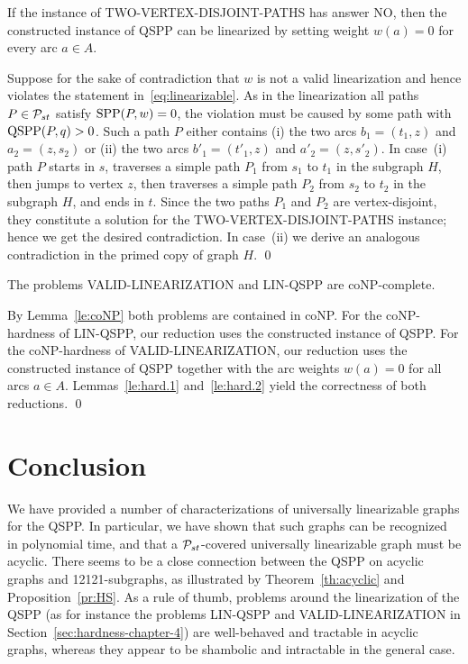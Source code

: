\begin{lemma}
\label{le:hard.2} 
If the instance of TWO-VERTEX-DISJOINT-PATHS has answer NO,
then the constructed instance of QSPP can be linearized by setting weight $w(a)=0$ for every arc $a\in A$.
\end{lemma}
\proof
Suppose for the sake of contradiction that $w$ is not a valid linearization and hence 
violates the statement in~\eqref{eq:linearizable}.
As in the linearization all paths $P\in{\cal P}_{st}$ satisfy $\text{SPP}(P,w)=0$, the violation must
be caused by some path with $\text{QSPP}(P,q)>0$.
Such a path $P$ either contains (i) the two arcs $b_1=(t_1,z)$ and $a_2=(z,s_2)$ or 
(ii) the two arcs $b'_1=(t'_1,z)$ and $a'_2=(z,s'_2)$.
In case~(i) path $P$ starts in $s$, traverses a simple path $P_1$ from $s_1$ to $t_1$ 
in the subgraph $H$, then jumps to vertex $z$, then traverses a simple path $P_2$ from 
$s_2$ to $t_2$ in the subgraph $H$, and ends in $t$.
Since the two paths $P_1$ and $P_2$ are vertex-disjoint, they constitute a solution for 
the TWO-VERTEX-DISJOINT-PATHS instance; hence we get the desired contradiction.
In case~(ii) we derive an analogous contradiction in the primed copy of graph $H$.
\qed

\begin{theorem}
\label{th:hard}
The problems VALID-LINEARIZATION and LIN-QSPP are coNP-complete.
\end{theorem}
\proof
By Lemma~\ref{le:coNP} both problems are contained in coNP.
For the coNP-hardness of LIN-QSPP, our reduction uses the constructed instance of QSPP.
For the coNP-hardness of VALID-LINEARIZATION, our reduction uses the constructed instance of QSPP
together with the arc weights $w(a)=0$ for all arcs $a\in A$.
Lemmas~\ref{le:hard.1} and~\ref{le:hard.2} yield the correctness of both reductions.
\qed


\medskip
\section{Conclusion}
\label{sec:conclusion-chapter-4}
We have provided a number of characterizations of universally linearizable graphs for the QSPP.
In particular, we have shown that such graphs can be recognized in polynomial time,
and that a ${\cal P}_{st}$-covered universally linearizable graph must be acyclic. 
There seems to be a close connection between the QSPP on acyclic graphs and 12121-subgraphs,
as illustrated by Theorem~\ref{th:acyclic} and Proposition~\ref{pr:HS}.
As a rule of thumb, problems around the linearization of the QSPP (as for instance 
the problems LIN-QSPP and VALID-LINEARIZATION in Section~\ref{sec:hardness-chapter-4}) 
are well-behaved and tractable in acyclic graphs, whereas they appear to be shambolic 
and intractable in the general case.

